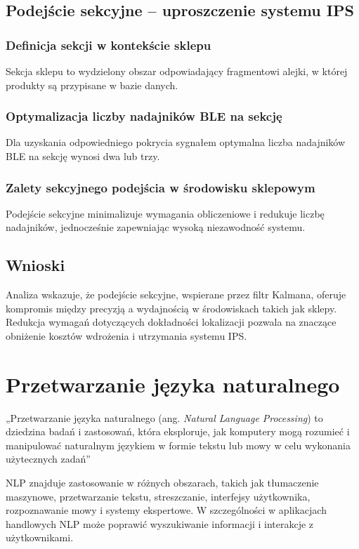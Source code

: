 \subsection{Podejście sekcyjne – uproszczenie systemu IPS}

\subsubsection{Definicja sekcji w kontekście sklepu}
Sekcja sklepu to wydzielony obszar odpowiadający fragmentowi alejki, w której produkty są przypisane w bazie danych.

\subsubsection{Optymalizacja liczby nadajników BLE na sekcję}
Dla uzyskania odpowiedniego pokrycia sygnałem optymalna liczba nadajników BLE na sekcję wynosi dwa lub trzy.

\subsubsection{Zalety sekcyjnego podejścia w środowisku sklepowym}
Podejście sekcyjne minimalizuje wymagania obliczeniowe i redukuje liczbę nadajników, jednocześnie zapewniając wysoką niezawodność systemu.

\subsection{Wnioski}
Analiza wskazuje, że podejście sekcyjne, wspierane przez filtr Kalmana, oferuje kompromis między precyzją a wydajnością w środowiskach takich jak sklepy. Redukcja wymagań dotyczących dokładności lokalizacji pozwala na znaczące obniżenie kosztów wdrożenia i utrzymania systemu IPS.


\section{Przetwarzanie języka naturalnego}

„Przetwarzanie języka naturalnego (ang. \textit{Natural Language Processing}) to dziedzina badań i zastosowań, która eksploruje, jak komputery mogą rozumieć i manipulować naturalnym językiem w formie tekstu lub mowy w celu wykonania użytecznych zadań” \\ \cite{Chowdhary2020} 


NLP znajduje zastosowanie w różnych obszarach, takich jak tłumaczenie maszynowe, przetwarzanie tekstu, streszczanie, interfejsy użytkownika, rozpoznawanie mowy i systemy ekspertowe. W szczególności w aplikacjach handlowych NLP może poprawić wyszukiwanie informacji i interakcje z użytkownikami.

